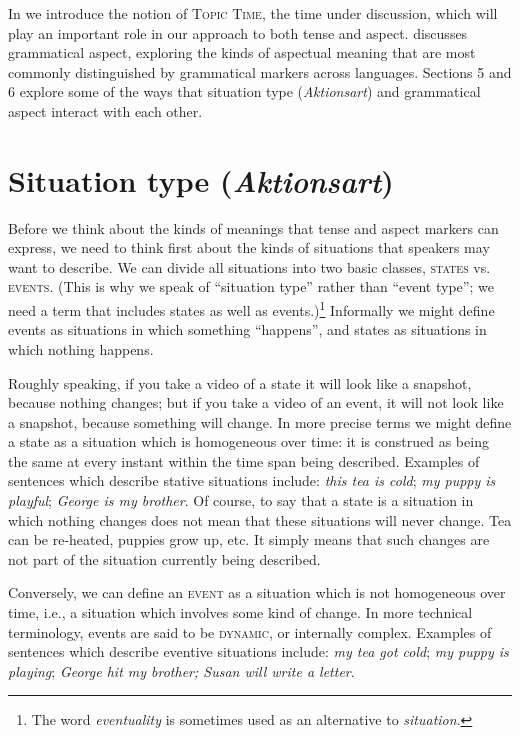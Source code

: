 In  we introduce the notion of \textsc{Topic Time}, the time under discussion, which will play an important role in our approach to both tense and aspect.  discusses grammatical aspect, exploring the kinds of aspectual meaning that are most commonly distinguished by grammatical markers across languages. Sections 5 and 6 explore some of the ways that situation type (\textit{Aktionsart}) and grammatical aspect interact with each other.


\section{Situation type (\textit{Aktionsart})}\label{sec:20.2}

Before we think about the kinds of meanings that tense and aspect markers can express, we need to think first about the kinds of situations that speakers may want to describe. We can divide all situations into two basic classes, \textsc{states} vs. \textsc{events}. (This is why we speak of “situation type” rather than “event type”; we need a term that includes states as well as events.)\footnote{The word \textit{eventuality} is sometimes used as an alternative to \textit{situation}.} Informally we might define events as situations in which something “happens”, and states as situations in which nothing happens.



Roughly speaking, if you take a video of a state it will look like a snapshot, because nothing changes; but if you take a video of an event, it will not look like a snapshot, because something will change. In more precise terms we might define a state as a situation which is homogeneous over time: it is construed as being the same at every instant within the time span being described. Examples of sentences which describe stative situations include: \textit{this tea is cold}; \textit{my puppy is playful}; \textit{George is my brother}. Of course, to say that a state is a situation in which nothing changes does not mean that these situations will never change. Tea can be re-heated, puppies grow up, etc. It simply means that such changes are not part of the situation currently being described.



Conversely, we can define an \textsc{event} as a situation which is not homogeneous over time, i.e., a situation which involves some kind of change. In more technical terminology, events are said to be \textsc{dynamic}, or internally complex. Examples of sentences which describe eventive situations include: \textit{my tea got cold}; \textit{my puppy is playing}; \textit{George hit my brother; Susan will write a letter}.



